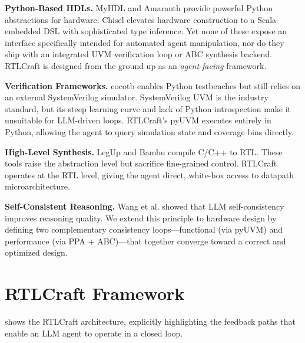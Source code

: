 \documentclass[11pt]{article}
\begin{document}
\textbf{Python-Based HDLs.} MyHDL\cite{myhdl} and Amaranth\cite{amaranth} provide powerful Python abstractions for hardware. Chisel\cite{chisel} elevates hardware construction to a Scala-embedded DSL with sophisticated type inference. Yet none of these expose an interface specifically intended for automated agent manipulation, nor do they ship with an integrated UVM verification loop or ABC synthesis backend. RTLCraft is designed from the ground up as an \textit{agent-facing} framework.

\textbf{Verification Frameworks.} cocotb\cite{cocotb} enables Python testbenches but still relies on an external SystemVerilog simulator. SystemVerilog UVM is the industry standard\cite{uvm}, but its steep learning curve and lack of Python introspection make it unsuitable for LLM-driven loops. RTLCraft's pyUVM executes entirely in Python, allowing the agent to query simulation state and coverage bins directly.

\textbf{High-Level Synthesis.} LegUp\cite{legup} and Bambu\cite{bambu} compile C/C++ to RTL. These tools raise the abstraction level but sacrifice fine-grained control. RTLCraft operates at the RTL level, giving the agent direct, white-box access to datapath microarchitecture.

\textbf{Self-Consistent Reasoning.} Wang et al.\cite{selfconsistency2022} showed that LLM self-consistency improves reasoning quality. We extend this principle to hardware design by defining two complementary consistency loops---functional (via pyUVM) and performance (via PPA + ABC)---that together converge toward a correct and optimized design.

\section{RTLCraft Framework}
\label{sec:framework}

 shows the RTLCraft architecture, explicitly highlighting the feedback paths that enable an LLM agent to operate in a closed loop.
\end{document}
